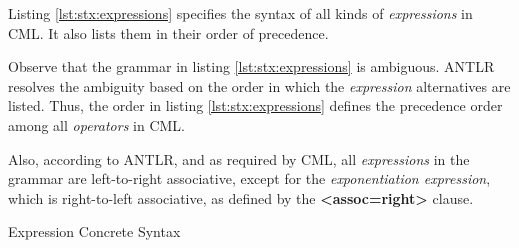 Listing \ref{lst:stx:expressions} specifies the syntax of all kinds of \emph{expressions} in CML.
It also lists them in their order of precedence.

Observe that the grammar in listing \ref{lst:stx:expressions} is ambiguous.
ANTLR \cite{antlr} resolves the ambiguity
based on the order in which the \emph{expression} alternatives are listed.
Thus, the order in listing \ref{lst:stx:expressions} defines
the precedence order among all \emph{operators} in CML.

Also, according to ANTLR,
and as required by CML,
all \emph{expressions} in the grammar are left-to-right associative,
except for the \emph{exponentiation expression},
which is right-to-left associative,
as defined by the \textbf{<assoc=right>} clause.

\begin{code}[H]
\verbatimfont{\small}

\caption{Expression Concrete Syntax}
\label{lst:stx:expressions}
\end{code}
